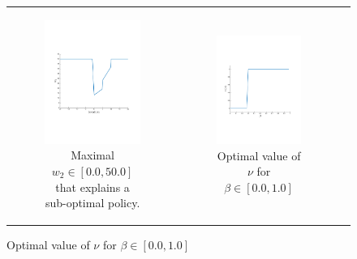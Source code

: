 {\centering
    \begin{figure}[ht]
        \begin{tabular}{ccc}
            \begin{subfigure}{0.33\textwidth}\centering\includegraphics[width=0.9\linewidth, height=0.55\linewidth]{images/robot_opt_new}\caption{Maximal {\footnotesize $w_2 \in \left[0.0, 50.0 \right]$} that explains a sub-optimal policy.}\label{fig:navigation_opt}\end{subfigure}&
            \begin{subfigure}{0.33\textwidth}\centering\includegraphics[width=0.9\linewidth, height=0.55\linewidth]{images/sir_opt_new}\caption{Optimal value of {\footnotesize $ \nu $} for {\footnotesize $ \beta \in \left[ 0.0, 1.0 \right] $}}\label{fig:sir_opt}\end{subfigure}&

\end{tabular}
\end{figure}}
